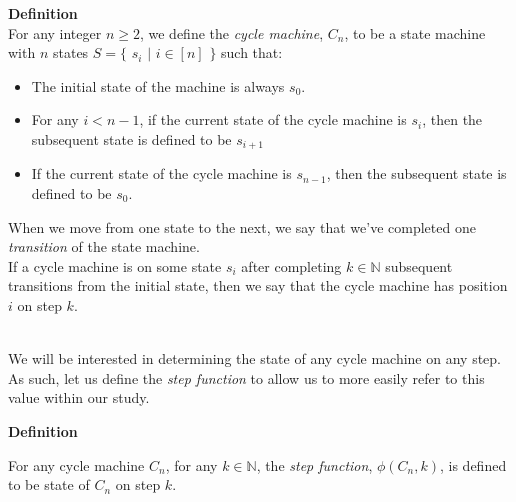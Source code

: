 \documentclass[a4paper,12pt]{article}
\begin{document}
\label{definition:cycle_machine}
\hypertarget{definition:cycle_machine}{}
\begin{tcolorbox}
\textbf{Definition}\\
For any integer $n \geq 2$, we define the \textit{cycle machine}, $C_n$, to be a state machine with $n$ states $S = \{$ $s_i$ $|$ $i \in [n]$ $\}$ such that:

\begin{itemize}
\item The initial state of the machine is always $s_0$.

\item For any $i < n - 1$, if the current state of the cycle machine is $s_i$, then the subsequent state is defined to be $s_{i+1}$

\item If the current state of the cycle machine is $s_{n - 1}$, then the subsequent state is defined to be $s_0$.
\end{itemize}

\noindent When we move from one state to the next, we say that we've completed one \textit{transition} of the state machine.\\

\noindent If a cycle machine is on some state $s_i$ after completing $k \in \mathbb{N}$ subsequent transitions from the initial state, then we say that the cycle machine has position $i$ on step $k$.\\
\end{tcolorbox}



\noindent \\
We will be interested in determining the state of any cycle machine on any step. As such, let us define the \textit{step function} to allow us to more easily refer to this value within our study.\\









\label{definition:cycle_step_function}
\hypertarget{definition:cycle_step_function}{}
\begin{tcolorbox}
\textbf{Definition}

\noindent For any cycle machine $C_n$, for any $k \in \mathbb{N}$, the \textit{step function}, $\phi(C_n, k)$, is defined to be state of $C_n$ on step $k$.
\end{tcolorbox}
\end{document}
